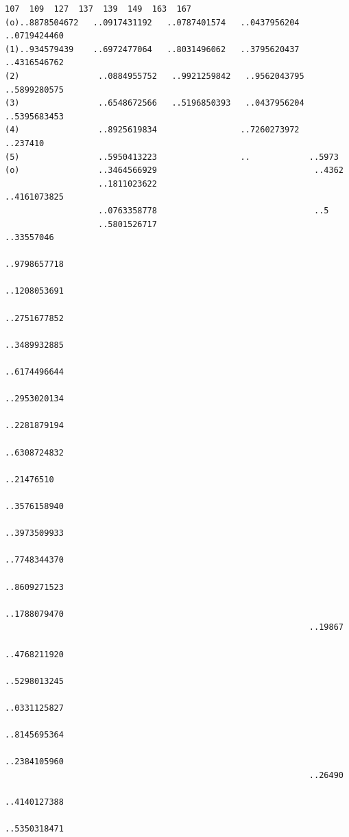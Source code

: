 \documentclass[10pt,a4paper]{article}
\begin{document}
\newpage
\setcounter{page}{428}

\begin{verbatim}
107  109  127  137  139  149  163  167
(o)..8878504672   ..0917431192   ..0787401574   ..0437956204   ..0719424460
(1)..934579439    ..6972477064   ..8031496062   ..3795620437   ..4316546762
(2)                ..0884955752   ..9921259842   ..9562043795   ..5899280575
(3)                ..6548672566   ..5196850393   ..0437956204   ..5395683453
(4)                ..8925619834                 ..7260273972   ..237410
(5)                ..5950413223                 ..            ..5973
(o)                ..3464566929                                ..4362
                   ..1811023622                                ..4161073825
                   ..0763358778                                ..5
                   ..5801526717                                ..33557046
                                                              ..9798657718
                                                              ..1208053691
                                                              ..2751677852
                                                              ..3489932885
                                                              ..6174496644
                                                              ..2953020134
                                                              ..2281879194
                                                              ..6308724832
                                                              ..21476510
                                                              ..3576158940
                                                              ..3973509933
                                                              ..7748344370
                                                              ..8609271523
                                                              ..1788079470
                                                              ..19867
                                                              ..4768211920
                                                              ..5298013245
                                                              ..0331125827
                                                              ..8145695364
                                                              ..2384105960
                                                              ..26490
                                                              ..4140127388
                                                              ..5350318471

\end{verbatim}
\end{document}
